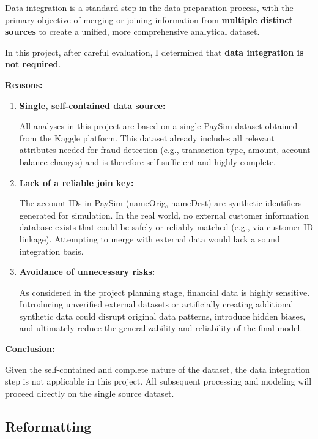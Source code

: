 \documentclass[sigplan,screen]{acmart}
\begin{document}
Data integration is a standard step in the data preparation process, with the primary objective of merging or joining information from \textbf{multiple distinct sources} to create a unified, more comprehensive analytical dataset.

In this project, after careful evaluation, I determined that \textbf{data integration is not required}.

\textbf{Reasons:}

\begin{enumerate}
    \item \textbf{Single, self-contained data source:}
    
    All analyses in this project are based on a single PaySim dataset obtained from the Kaggle platform. This dataset already includes all relevant attributes needed for fraud detection (e.g., transaction type, amount, account balance changes) and is therefore self-sufficient and highly complete.
    
    \item \textbf{Lack of a reliable join key:}
    
    The account IDs in PaySim (nameOrig, nameDest) are synthetic identifiers generated for simulation. In the real world, no external customer information database exists that could be safely or reliably matched (e.g., via customer ID linkage). Attempting to merge with external data would lack a sound integration basis.
    
    \item \textbf{Avoidance of unnecessary risks:}
    
    As considered in the project planning stage, financial data is highly sensitive. Introducing unverified external datasets or artificially creating additional synthetic data could disrupt original data patterns, introduce hidden biases, and ultimately reduce the generalizability and reliability of the final model.
\end{enumerate}

\textbf{Conclusion:}

Given the self-contained and complete nature of the dataset, the data integration step is not applicable in this project. All subsequent processing and modeling will proceed directly on the single source dataset.

\subsection{Reformatting}
\end{document}
